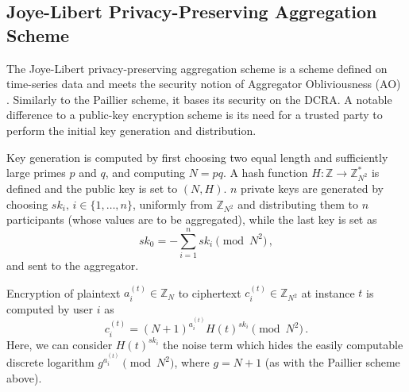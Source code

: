 \documentclass[10pt,letterpaper,oneside,twocolumn,journal]{IEEEtran}
\theoremstyle{definition}
\theoremstyle{definition}
\theoremstyle{remark}
\begin{document}
% 
% 

\subsection{Joye-Libert Privacy-Preserving Aggregation Scheme} \label{subsec:joye_libert_scheme}
The Joye-Libert privacy-preserving aggregation scheme \cite{joyeScalableSchemePrivacyPreserving2013} is a scheme defined on time-series data and meets the security notion of Aggregator Obliviousness (AO) \cite{shiPrivacyPreservingAggregationTimeSeries2011}. Similarly to the Paillier scheme, it bases its security on the DCRA. A notable difference to a public-key encryption scheme is its need for a trusted party to perform the initial key generation and distribution.

Key generation is computed by first choosing two equal length and sufficiently large primes $p$ and $q$, and computing $N=pq$. A hash function $H:\mathbb{Z} \rightarrow \mathbb{Z}_{N^2}^*$ is defined and the public key is set to $(N, H)$. $n$ private keys are generated by choosing $sk_i,\,i\in\{1,\dots,n\}$, uniformly from $\mathbb{Z}_{N^2}$ and distributing them to $n$ participants (whose values are to be aggregated), while the last key is set as
\begin{equation}
    sk_0 = -\sum^{n}_{i=1}sk_i \pmod{N^2}\,,
\end{equation}
and sent to the aggregator.

Encryption of plaintext $a^{(t)}_{i} \in \mathbb{Z}_N$ to ciphertext $c^{(t)}_{i} \in \mathbb{Z}_{N^2}$ at instance $t$ is computed by user $i$ as
\begin{equation}
    c^{(t)}_{i} = (N+1)^{a^{(t)}_{i}} H(t)^{sk_i} \pmod{N^2}\,.
\end{equation}
Here, we can consider $H(t)^{sk_i}$ the noise term which hides the easily computable discrete logarithm $g^{a^{(t)}_{i}} \pmod{N^2}$, where $g=N+1$ (as with the Paillier scheme above).
\end{document}
